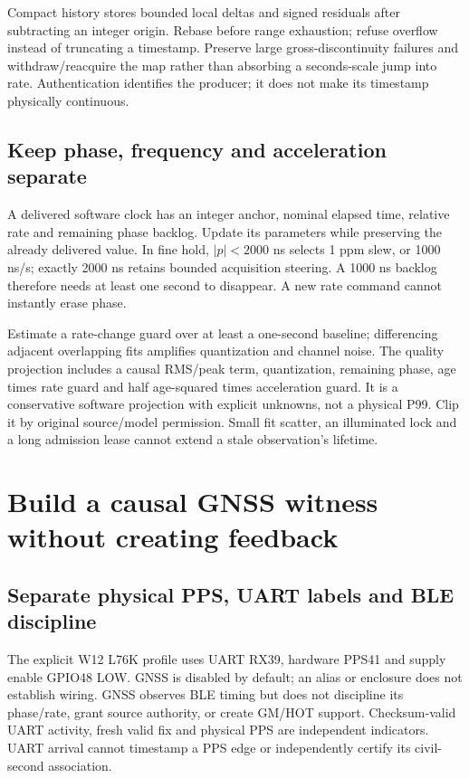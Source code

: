 \documentclass[10pt,letterpaper]{article}
\begin{document}
Compact history stores bounded local deltas and signed residuals after subtracting an integer origin. Rebase before range exhaustion; refuse overflow instead of truncating a timestamp. Preserve large gross-discontinuity failures and withdraw/reacquire the map rather than absorbing a seconds-scale jump into rate. Authentication identifies the producer; it does not make its timestamp physically continuous.

\subsection{Keep phase, frequency and acceleration separate}
A delivered software clock has an integer anchor, nominal elapsed time, relative rate and remaining phase backlog. Update its parameters while preserving the already delivered value. In fine hold, $|p|<2000$ ns selects 1 ppm slew, or 1000 ns/s; exactly 2000 ns retains bounded acquisition steering. A 1000 ns backlog therefore needs at least one second to disappear. A new rate command cannot instantly erase phase.

Estimate a rate-change guard over at least a one-second baseline; differencing adjacent overlapping fits amplifies quantization and channel noise. The quality projection includes a causal RMS/peak term, quantization, remaining phase, age times rate guard and half age-squared times acceleration guard. It is a conservative software projection with explicit unknowns, not a physical P99. Clip it by original source/model permission. Small fit scatter, an illuminated lock and a long admission lease cannot extend a stale observation's lifetime.
\newpage
\section{Build a causal GNSS witness without creating feedback}
\subsection{Separate physical PPS, UART labels and BLE discipline}
The explicit W12 L76K profile uses UART RX39, hardware PPS41 and supply enable GPIO48 LOW. GNSS is disabled by default; an alias or enclosure does not establish wiring. GNSS observes BLE timing but does not discipline its phase/rate, grant source authority, or create GM/HOT support. Checksum-valid UART activity, fresh valid fix and physical PPS are independent indicators. UART arrival cannot timestamp a PPS edge or independently certify its civil-second association.
\end{document}
